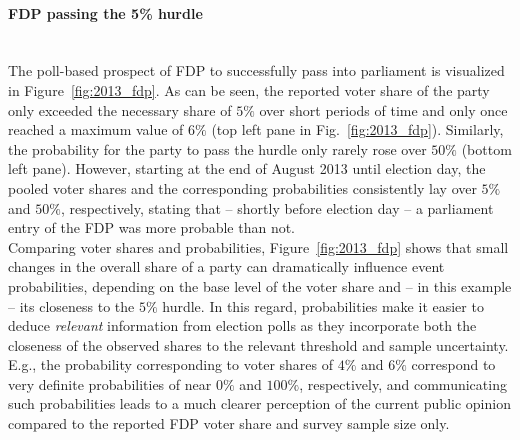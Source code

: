 \documentclass[smallcondensed]{svjour3}     %
\begin{document}
\paragraph{FDP passing the 5\% hurdle} \ \\
The poll-based prospect of FDP to successfully pass into parliament is visualized
in Figure~\ref{fig:2013_fdp}.
As can be seen, the reported voter share of the party only exceeded the necessary share
of $5\%$ over short periods of time and only once reached a maximum value
of $6\%$ (top left pane in Fig.~\ref{fig:2013_fdp}). Similarly, the probability
for the party to pass the hurdle only rarely rose over $50\%$ (bottom left pane).
However, starting at the end of August 2013 until election day, the pooled voter
shares and the corresponding probabilities consistently lay over $5\%$ and $50\%$,
respectively, stating that -- shortly before election day -- a parliament entry
of the FDP was more probable than not.\\

Comparing voter shares and probabilities, Figure~\ref{fig:2013_fdp} shows
that small changes in the overall share of a party can dramatically influence
event probabilities, depending on the base level of the voter share and
-- in this example -- its closeness to the $5\%$ hurdle.
In this regard, probabilities make it easier to deduce {\it relevant} information
from election polls as they incorporate both the closeness of the observed shares
to the relevant threshold and sample uncertainty.
E.g., the probability corresponding to voter shares of $4\%$ and $6\%$ correspond to
very definite probabilities of near $0\%$ and $100\%$, respectively,
and communicating such probabilities leads to a much clearer perception of
the current public opinion compared to the reported FDP voter share and
survey sample size only.
\end{document}
